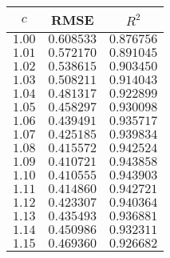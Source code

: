 \begin{tabular}{ccc} \toprule
$c$    & RMSE       & $R^2$      \\\midrule
$1.00$ & $0.608533$ & $0.876756$ \\
$1.01$ & $0.572170$ & $0.891045$ \\
$1.02$ & $0.538615$ & $0.903450$ \\
$1.03$ & $0.508211$ & $0.914043$ \\
$1.04$ & $0.481317$ & $0.922899$ \\
$1.05$ & $0.458297$ & $0.930098$ \\
$1.06$ & $0.439491$ & $0.935717$ \\
$1.07$ & $0.425185$ & $0.939834$ \\
$1.08$ & $0.415572$ & $0.942524$ \\
$1.09$ & $0.410721$ & $0.943858$ \\
$1.10$ & $0.410555$ & $0.943903$ \\
$1.11$ & $0.414860$ & $0.942721$ \\
$1.12$ & $0.423307$ & $0.940364$ \\
$1.13$ & $0.435493$ & $0.936881$ \\
$1.14$ & $0.450986$ & $0.932311$ \\
$1.15$ & $0.469360$ & $0.926682$ \\\bottomrule
\end{tabular}
